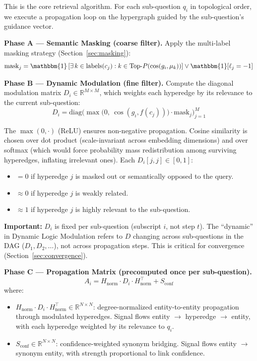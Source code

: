 \documentclass[11pt,a4paper]{article}
\begin{document}
This is the core retrieval algorithm. For each sub-question $q_i$ in topological order, we execute a propagation loop on the hypergraph guided by the sub-question's guidance vector.

\textbf{Phase A --- Semantic Masking (coarse filter).} Apply the multi-label masking strategy (Section~\ref{sec:masking}):
\begin{equation}
    \text{mask}_j = \mathbbm{1}\left[\exists\, k \in \text{labels}(c_j) : k \in \text{Top-}P(\cos(g_i, \mu_k))\right] \lor \mathbbm{1}[\ell_j = -1]
\end{equation}

\textbf{Phase B --- Dynamic Modulation (fine filter).} Compute the diagonal modulation matrix $D_i \in \mathbb{R}^{M \times M}$, which weights each hyperedge by its relevance to the current sub-question:
\begin{equation}
    D_i = \text{diag}\Big(\max\big(0,\ \cos(g_i, f(c_j))\big) \cdot \text{mask}_j\Big)_{j=1}^{M}
\end{equation}

The $\max(0, \cdot)$ (ReLU) ensures non-negative propagation. Cosine similarity is chosen over dot product (scale-invariant across embedding dimensions) and over softmax (which would force probability mass redistribution among surviving hyperedges, inflating irrelevant ones). Each $D_i[j,j] \in [0, 1]$:
\begin{itemize}[leftmargin=*]
    \item $= 0$ if hyperedge $j$ is masked out or semantically opposed to the query.
    \item $\approx 0$ if hyperedge $j$ is weakly related.
    \item $\approx 1$ if hyperedge $j$ is highly relevant to the sub-question.
\end{itemize}

\textbf{Important:} $D_i$ is fixed per sub-question (subscript $i$, not step $t$). The ``dynamic'' in Dynamic Logic Modulation refers to $D$ changing across sub-questions in the DAG ($D_1, D_2, \ldots$), not across propagation steps. This is critical for convergence (Section~\ref{sec:convergence}).

\textbf{Phase C --- Propagation Matrix (precomputed once per sub-question).}
\begin{equation}
\label{eq:propagation_matrix}
    A_i = H_{\text{norm}} \cdot D_i \cdot H_{\text{norm}}^\top + S_{\text{conf}}
\end{equation}
where:
\begin{itemize}[leftmargin=*]
    \item $H_{\text{norm}} \cdot D_i \cdot H_{\text{norm}}^\top \in \mathbb{R}^{N \times N}$: degree-normalized entity-to-entity propagation through modulated hyperedges. Signal flows entity $\to$ hyperedge $\to$ entity, with each hyperedge weighted by its relevance to $q_i$.
    \item $S_{\text{conf}} \in \mathbb{R}^{N \times N}$: confidence-weighted synonym bridging. Signal flows entity $\to$ synonym entity, with strength proportional to link confidence.
\end{itemize}
\end{document}
